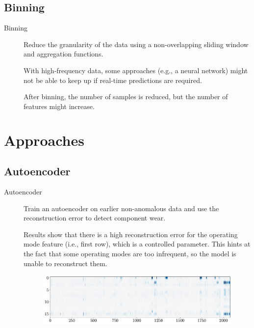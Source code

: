 \subsection{Binning}

\begin{description}
    \item[Binning] 
        Reduce the granularity of the data using a non-overlapping sliding window and aggregation functions.

        \begin{remark}
            With high-frequency data, some approaches (e.g., a neural network) might not be able to keep up if real-time predictions are required.
        \end{remark}

        \begin{remark}
            After binning, the number of samples is reduced, but the number of features might increase.
        \end{remark}
\end{description}



\section{Approaches}


\subsection{Autoencoder}

\begin{description}
    \item[Autoencoder]
        Train an autoencoder on earlier non-anomalous data and use the reconstruction error to detect component wear.

        Results show that there is a high reconstruction error for the operating mode feature (i.e., first row), which is a controlled parameter. This hints at the fact that some operating modes are too infrequent, so the model is unable to reconstruct them.
        \begin{figure}[H]
            \centering
            \includegraphics[width=0.9\linewidth]{./img/_skinwrapper_autoencoder.pdf}
        \end{figure}

\end{description}

